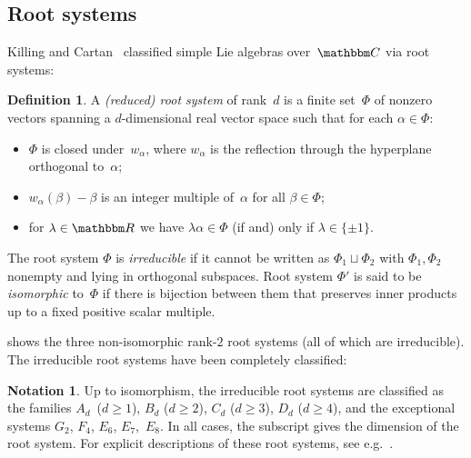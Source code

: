 \documentclass[10pt,a4paper]{article}
\theoremstyle{definition}
\newtheorem{definition}[theorem]{Definition}
\newtheorem{notation}[theorem]{Notation}
\newcommand{\R}{\mathbbm R}
\newcommand{\C}{\mathbbm C}
\begin{document}
\subsection{Root systems}

Killing and Cartan~\cite{Car94} classified simple Lie algebras over~$\C$ via root systems:
\begin{definition}
    A \emph{(reduced) root system} of rank~$d$ is a finite set~$\Phi$ of nonzero vectors spanning a $d$-dimensional real vector space such that for each $\alpha \in \Phi$:
    \begin{itemize}
        \item $\Phi$ is closed under~$w_\alpha$, where $w_\alpha$ is the reflection through the hyperplane orthogonal to~$\alpha$;
        \item $w_\alpha(\beta) - \beta$ is an integer multiple of~$\alpha$ for all $\beta \in \Phi$;
        \item for $\lambda \in \R$ we have $\lambda \alpha \in \Phi$ (if and) only if $\lambda \in \{\pm 1\}$.
    \end{itemize}
    The root system $\Phi$ is \emph{irreducible} if it cannot be written as $\Phi_1 \sqcup \Phi_2$ with $\Phi_1, \Phi_2$ nonempty and lying in orthogonal subspaces.
    Root system $\Phi'$ is said to be \emph{isomorphic} to~$\Phi$ if there is bijection between them that preserves inner products up to a fixed positive scalar multiple.
\end{definition}

 shows the three non-isomorphic rank-$2$ root systems (all of which are irreducible).
The irreducible root systems have been completely classified:
\begin{notation}
    Up to isomorphism, the irreducible root systems are classified as the families $A_d$~($d \geq 1$), $B_d$ ($d \geq 2$), $C_d$ ($d \geq 3$), $D_d$ ($d \geq 4$), and the exceptional systems $G_2$, $F_4$, $E_6$, $E_7$,~$E_8$.
    In all cases, the subscript gives the dimension of the root system.
    For explicit descriptions of these root systems, %
    see e.g.~\cite[Sec.~3.6]{Car89}.
\end{notation}
\end{document}
